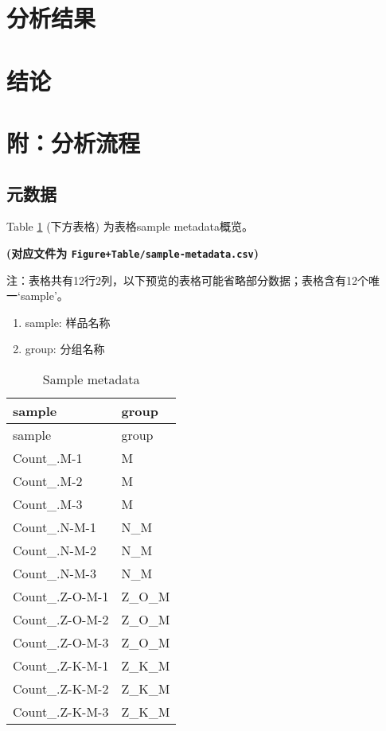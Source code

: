 \documentclass[
]{article}
\providecommand{\tightlist}{%
  \setlength{\itemsep}{0pt}\setlength{\parskip}{0pt}}
\begin{document}
\hypertarget{results}{%
\section{分析结果}\label{results}}

\hypertarget{dis}{%
\section{结论}\label{dis}}

\hypertarget{workflow}{%
\section{附：分析流程}\label{workflow}}

\hypertarget{ux5143ux6570ux636e}{%
\subsection{元数据}\label{ux5143ux6570ux636e}}

Table \ref{tab:sample-metadata} (下方表格) 为表格sample metadata概览。

\textbf{(对应文件为 \texttt{Figure+Table/sample-metadata.csv})}

\begin{center}\begin{tcolorbox}[colback=gray!10, colframe=gray!50, width=0.9\linewidth, arc=1mm, boxrule=0.5pt]注：表格共有12行2列，以下预览的表格可能省略部分数据；表格含有12个唯一`sample'。
\end{tcolorbox}
\end{center}
\begin{center}\begin{tcolorbox}[colback=gray!10, colframe=gray!50, width=0.9\linewidth, arc=1mm, boxrule=0.5pt]\begin{enumerate}\tightlist
\item sample: 样品名称
\item group: 分组名称
\end{enumerate}\end{tcolorbox}
\end{center}

\begin{longtable}[]{@{}ll@{}}
\caption{\label{tab:sample-metadata}Sample metadata}\tabularnewline
\toprule
sample & group\tabularnewline
\midrule
\endfirsthead
\toprule
sample & group\tabularnewline
\midrule
\endhead
Count\_.M-1 & M\tabularnewline
Count\_.M-2 & M\tabularnewline
Count\_.M-3 & M\tabularnewline
Count\_.N-M-1 & N\_M\tabularnewline
Count\_.N-M-2 & N\_M\tabularnewline
Count\_.N-M-3 & N\_M\tabularnewline
Count\_.Z-O-M-1 & Z\_O\_M\tabularnewline
Count\_.Z-O-M-2 & Z\_O\_M\tabularnewline
Count\_.Z-O-M-3 & Z\_O\_M\tabularnewline
Count\_.Z-K-M-1 & Z\_K\_M\tabularnewline
Count\_.Z-K-M-2 & Z\_K\_M\tabularnewline
Count\_.Z-K-M-3 & Z\_K\_M\tabularnewline
\bottomrule
\end{longtable}
\end{document}
